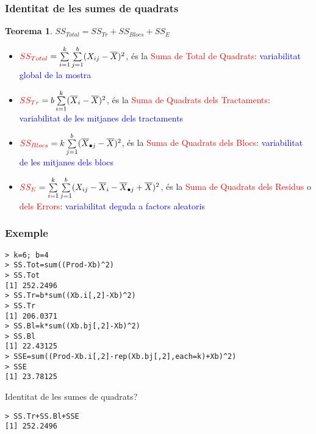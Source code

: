 \documentclass[12pt,t]{beamer}
\newcommand{\red}[1]{\textcolor{red}{#1}}
\newcommand{\blue}[1]{\textcolor{blue}{#1}}
\theoremstyle{plain}
\newtheorem{teorema}{Teorema}
\theoremstyle{definition}
\begin{document}
\begin{frame}
\frametitle{Identitat de les sumes de quadrats}\vspace*{-3ex} 

\begin{teorema}
$SS_{Total}=SS_{Tr}+SS_{Blocs}+SS_E$
\end{teorema}
\vspace*{-2ex}

\begin{itemize}
\item $\red{SS_{Total}} = \sum\limits_{i=1}^k\sum\limits_{j=1}^b (X_{ij}-
\overline{X})^2$, és la \red{Suma de Total de Quadrats}: \blue{variabilitat global de la mostra} 

\item $\red{SS_{Tr}}=b\sum\limits_{i=1}^k
(\overline{X}_{i}-\overline{X})^2$, és la \red{Suma de Quadrats dels Tractaments}: \blue{variabilitat 
de les mitjanes dels tractaments} 

\item $\red{SS_{Blocs}}=k\sum\limits_{j=1}^b (\overline{X}_{\bullet
j}-\overline{X})^2$, és la \red{Suma de Quadrats dels Blocs}: \blue{variabilitat 
de les mitjanes dels blocs} 

\item $\red{SS_E}= \sum\limits_{i=1}^k\sum\limits_{j=1}^b (X_{ij} - \overline{X}_{i}-
\overline{X}_{\bullet j}+\overline{X})^2$, és la \red{Suma de Quadrats dels Residus} o \red{dels Errors}: \blue{variabilitat  deguda a factors aleatoris}
\end{itemize}

\end{frame}


\begin{frame}[fragile]
\frametitle{Exemple}\vspace*{-1ex} 


\begin{lstlisting}
> k=6; b=4
> SS.Tot=sum((Prod-Xb)^2)
> SS.Tot
[1] 252.2496
> SS.Tr=b*sum((Xb.i[,2]-Xb)^2)
> SS.Tr
[1] 206.0371
> SS.Bl=k*sum((Xb.bj[,2]-Xb)^2)
> SS.Bl
[1] 22.43125
> SSE=sum((Prod-Xb.i[,2]-rep(Xb.bj[,2],each=k)+Xb)^2)
> SSE
[1] 23.78125
\end{lstlisting}\medskip

Identitat de les sumes de quadrats?


\begin{lstlisting}
> SS.Tr+SS.Bl+SSE
[1] 252.2496
\end{lstlisting}

\end{frame}
\end{document}
